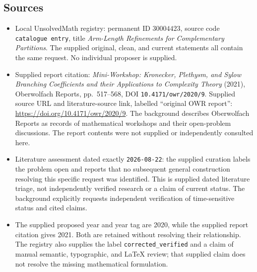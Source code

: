 \documentclass[11pt]{article}
\begin{document}
\subsection{Sources}
\begin{itemize}
\item Local UnsolvedMath registry: permanent ID \(30004423\), source code \texttt{catalogue entry}, title \emph{Arm-Length Refinements for Complementary Partitions}. The supplied original, clean, and current statements all contain the same request. No individual proposer is supplied.
\item Supplied report citation: \emph{Mini-Workshop: Kronecker, Plethysm, and Sylow Branching Coefficients and their Applications to Complexity Theory} (2021), Oberwolfach Reports, pp.\ 517--568, DOI \texttt{10.4171/owr/2020/9}. Supplied source URL and literature-source link, labelled ``original OWR report'': \url{https://doi.org/10.4171/owr/2020/9}. The background describes Oberwolfach Reports as records of mathematical workshops and their open-problem discussions. The report contents were not supplied or independently consulted here.
\item Literature assessment dated exactly \texttt{2026-08-22}: the supplied curation labels the problem open and reports that no subsequent general construction resolving this specific request was identified. This is supplied dated literature triage, not independently verified research or a claim of current status. The background explicitly requests independent verification of time-sensitive status and cited claims.
\item The supplied proposed year and year tag are 2020, while the supplied report citation gives 2021. Both are retained without resolving their relationship. The registry also supplies the label \texttt{corrected\_verified} and a claim of manual semantic, typographic, and LaTeX review; that supplied claim does not resolve the missing mathematical formulation.
\end{itemize}
\end{document}
